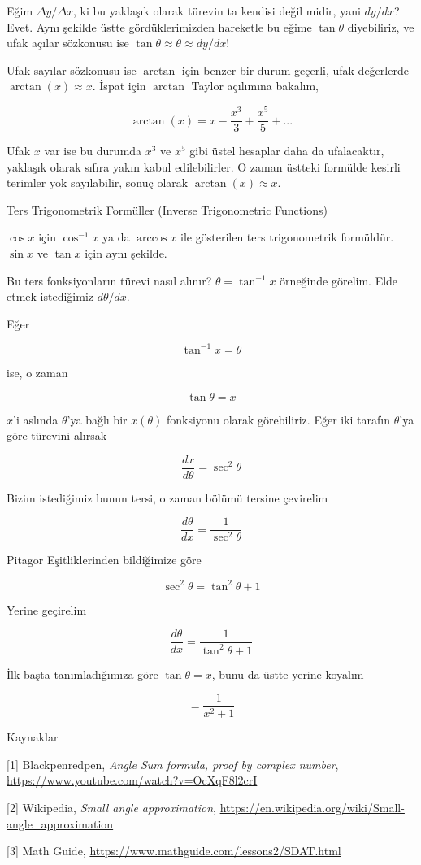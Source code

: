 \documentclass[12pt,fleqn]{article}\usepackage{../../common}
\begin{document}
Eğim $\Delta y / \Delta x$, ki bu yaklaşık olarak türevin ta kendisi değil
midir, yani $dy / dx$? Evet. Aynı şekilde üstte gördüklerimizden hareketle
bu eğime $\tan\theta$ diyebiliriz, ve ufak açılar sözkonusu ise
$\tan\theta \approx \theta \approx dy / dx$!

Ufak sayılar sözkonusu ise $\arctan$ için benzer bir durum geçerli, ufak
değerlerde $\arctan(x) \approx x$. İspat için $\arctan$ Taylor açılımına
bakalım,

$$
\arctan(x) = x - \frac{x^3}{3} + \frac{x^5}{5} + ...
$$

Ufak $x$ var ise bu durumda $x^3$ ve $x^5$ gibi üstel hesaplar daha da
ufalacaktır, yaklaşık olarak sıfıra yakın kabul edilebilirler. O zaman üstteki
formülde kesirli terimler yok sayılabilir, sonuç olarak $\arctan(x) \approx x$.

Ters Trigonometrik Formüller (Inverse Trigonometric Functions)

$\cos x$ için $\cos^{-1} x$ ya da $\arccos x$ ile gösterilen ters
trigonometrik formüldür. $\sin x$ ve $\tan x$ için aynı şekilde. 

Bu ters fonksiyonların türevi nasıl alınır? $\theta = \tan^{-1}x$ örneğinde
görelim. Elde etmek istediğimiz $d\theta/dx$. 

Eğer

$$ \tan^{-1}x = \theta$$

ise, o zaman 

$$ \tan\theta = x $$

$x$'i aslında $\theta$'ya bağlı bir $x(\theta)$ fonksiyonu olarak görebiliriz. 
Eğer iki tarafın $\theta$'ya göre türevini alırsak

$$ \frac{dx}{d\theta} = \sec^{2}\theta $$

Bizim istediğimiz bunun tersi, o zaman bölümü tersine çevirelim

$$ \frac{d\theta}{dx} = \frac{1}{\sec^{2}\theta} $$

Pitagor Eşitliklerinden bildiğimize göre

$$ \sec^{2}\theta = \tan^{2}\theta + 1 $$

Yerine geçirelim

$$ \frac{d\theta}{dx} = \frac{1}{\tan^{2}\theta + 1} $$

İlk başta tanımladığımıza göre $\tan\theta = x$, bunu da üstte yerine
koyalım

$$  = \frac{1}{x^2 + 1} $$

Kaynaklar 

[1] Blackpenredpen, {\em Angle Sum formula, proof by complex number},
     \url{https://www.youtube.com/watch?v=OcXqF8l2crI}
     
[2] Wikipedia, {\em Small angle approximation},
    \url{https://en.wikipedia.org/wiki/Small-angle_approximation}

[3] Math Guide,
    \url{https://www.mathguide.com/lessons2/SDAT.html}
\end{document}
